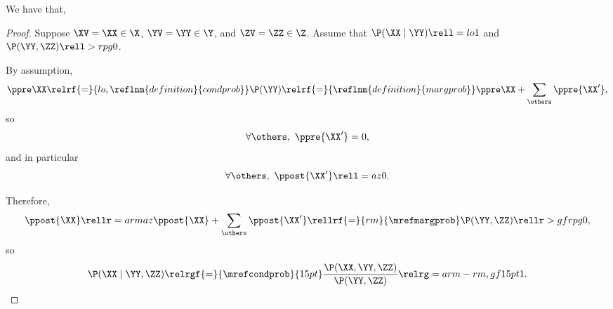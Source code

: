 \begin{proposition}
  We have that, %
\end{proposition}

\begin{proof}
  Suppose 
  $\XV = \XX \in \X$,
  $\YV = \YY \in \Y$, and
  $\ZV = \ZZ \in \Z$. Assume that $\P(\XX \mid \YY) \rell = lo 1$ and $\P(\YY, \ZZ) \rell > rpg 0$.

  By assumption,
  $$\ppre\XX \relrf{=}{lo,\reflnm{definition}{condprob}} \P(\YY) 
  \relrf{=}{\reflnm{definition}{margprob}} \ppre\XX + \sum_{\others}\ppre{\XX'},$$
    so
    $$\forall \others,\ \ppre{\XX'} = 0,$$
  and in particular
  $$\forall \others,\ \ppost{\XX'} \rell = az 0.$$

  Therefore, $$\ppost{\XX} \rellr = arm az \ppost{\XX} + \sum_{\others}\ppost{\XX'} 
  \rellrf{=}{rm}{\mrefmargprob} \P(\YY, \ZZ) \rellr > gf rpg 0,$$
  so $$\P(\XX \mid \YY, \ZZ) 
  \relrgf{=}{\mrefcondprob}{15pt} \frac{\P(\XX, \YY, \ZZ)}{\P(\YY, \ZZ)} 
  \relrg = arm-rm,gf 15pt 1.$$%
\end{proof}
